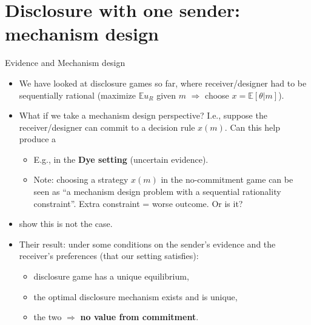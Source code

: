 \documentclass[english,10pt
,aspectratio=169
]{beamer}
\begin{document}
\section{Disclosure with one sender: mechanism design}

\begin{frame}{Evidence and Mechanism design}
\begin{itemize}
	\item We have looked at disclosure games so far, where receiver/designer had to be sequentially rational (maximize $\mathbb{E}u_R$ given $m$ $\Rightarrow$ choose $x=\mathbb{E}[\theta|m]$).
	\item What if we take a mechanism design perspective? I.e., suppose the receiver/designer can \alert{commit} to a decision rule $x(m)$. Can this help produce a 
	\begin{itemize}
		\item E.g., in the \textbf{Dye setting} (uncertain evidence).
		\item Note: choosing a strategy $x(m)$ in the no-commitment game can be seen as ``a mechanism design problem with a sequential rationality constraint''. Extra constraint = worse outcome. Or is it?
	\end{itemize}

	\pause \bigskip 
	\item \citet*{hart_evidence_2017} show this is not the case.
	\item Their result: under some conditions on the sender's evidence and the receiver's preferences (that our setting satisfies): 
	\begin{itemize}
		\item disclosure game has a unique equilibrium,
		\item the optimal disclosure mechanism exists and is unique,
		\item the two  $\Rightarrow$ \textbf{no value from commitment}.
	\end{itemize}
\end{itemize}
\end{frame}
\end{document}
